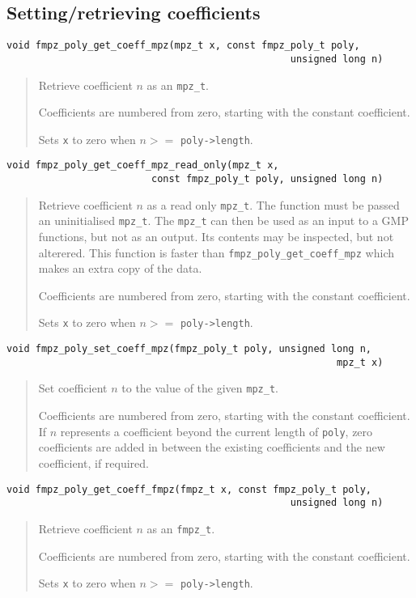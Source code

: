 \documentclass[a4paper,10pt]{article}
\newcommand{\code}{\lstinline}
\begin{document}
\subsection{Setting/retrieving coefficients}

\begin{lstlisting}
void fmpz_poly_get_coeff_mpz(mpz_t x, const fmpz_poly_t poly, 
                                                 unsigned long n)
\end{lstlisting}
\begin{quote}
Retrieve coefficient $n$ as an \code{mpz_t}. 

Coefficients are numbered from zero, starting with the constant coefficient.

Sets \code{x} to zero when $n >= $ \code{poly->length}. 
\end{quote}

\begin{lstlisting}
void fmpz_poly_get_coeff_mpz_read_only(mpz_t x, 
                         const fmpz_poly_t poly, unsigned long n)
\end{lstlisting}
\begin{quote}
Retrieve coefficient $n$ as a read only \code{mpz_t}. The function must be passed an uninitialised \code{mpz_t}. The \code{mpz_t} can then be used as an input to a GMP functions, but not as an output. Its contents may be inspected, but not alterered. This function is faster than \code{fmpz_poly_get_coeff_mpz} which makes an extra copy of the data. 

Coefficients are numbered from zero, starting with the constant coefficient.

Sets \code{x} to zero when $n >= $ \code{poly->length}. 
\end{quote}

\begin{lstlisting}
void fmpz_poly_set_coeff_mpz(fmpz_poly_t poly, unsigned long n, 
                                                         mpz_t x) 
\end{lstlisting}
\begin{quote}
Set coefficient $n$ to the value of the given \code{mpz_t}. 

Coefficients are numbered from zero, starting with the constant coefficient. If $n$ represents a coefficient beyond the current length of \code{poly}, zero coefficients are added in between the existing coefficients and the new coefficient, if required.
\end{quote}

\begin{lstlisting}
void fmpz_poly_get_coeff_fmpz(fmpz_t x, const fmpz_poly_t poly, 
                                                 unsigned long n)
\end{lstlisting}
\begin{quote}
Retrieve coefficient $n$ as an \code{fmpz_t}. 

Coefficients are numbered from zero, starting with the constant coefficient.

Sets \code{x} to zero when $n >= $ \code{poly->length}. 
\end{quote}
\end{document}
